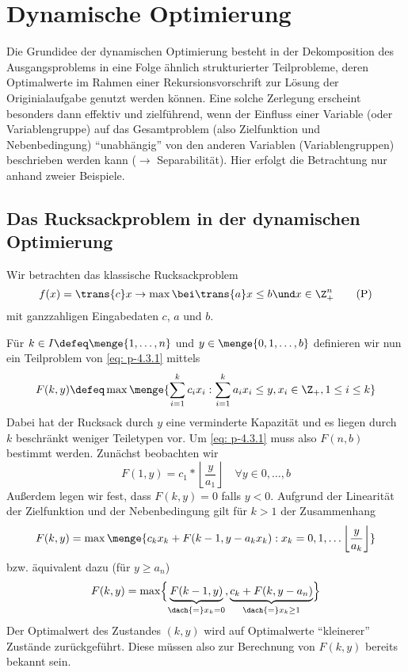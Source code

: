 \section{Dynamische Optimierung}

Die Grundidee der dynamischen Optimierung  besteht in der Dekomposition des Ausgangsproblems in eine Folge ähnlich strukturierter Teilprobleme, deren Optimalwerte im Rahmen einer Rekursionsvorschrift zur Lösung der Originialaufgabe genutzt werden können. Eine solche Zerlegung erscheint besonders dann effektiv und zielführend, wenn der Einfluss einer Variable (oder Variablengruppe) auf das Gesamtproblem (also Zielfunktion und Nebenbedingung) \enquote{unabhängig} von den anderen Variablen (Variablengruppen) beschrieben werden kann ($\to$ Separabilität). Hier erfolgt die Betrachtung nur anhand zweier Beispiele.

\subsection{Das Rucksackproblem in der dynamischen Optimierung}
Wir betrachten das klassische Rucksackproblem 
\begin{equation*}
	f(x) = \trans{c} x \to \max \bei \trans{a}x \le b \und x \in \Z_+^n \tag{P} \label{eq: p-4.3.1}
\end{equation*}
mit ganzzahligen Eingabedaten $c$, $a$ und $b$.

Für $k \in I \defeq \menge{1, \dots, n}$ und $y \in \menge{0,1,\dots, b}$ definieren wir nun ein Teilproblem von \eqref{eq: p-4.3.1} mittels
\begin{equation*}
	F(k,y) \defeq \max\menge{\sum_{i=1}^k c_i x_i : \sum_{i=1}^k a_i x_i \le y, x_i \in \Z_+, 1 \le i \le k}
\end{equation*}
Dabei hat der Rucksack durch $y$ eine verminderte Kapazität und es liegen durch $k$ beschränkt weniger Teiletypen vor.
Um \eqref{eq: p-4.3.1} muss also $F(n,b)$ bestimmt werden.
Zunächst beobachten wir
\begin{equation*}
	F(1,y) = c_1 * \left\lfloor \frac{y}{a_1} \right\rfloor \quad \forall y \in {0, \dots, b}
\end{equation*}
Außerdem legen wir fest, dass $F(k,y) = 0$ falls $y < 0$.
Aufgrund der Linearität der Zielfunktion und der Nebenbedingung gilt für $k > 1$ der Zusammenhang
\begin{equation*}
	F(k,y) = \max\menge{c_k x_k + F(k-1, y-a_k x_k): x_k = 0,1,\dots \left\lfloor \frac{y}{a_k} \right\rfloor}
\end{equation*}
bzw. äquivalent dazu (für $y \ge a_n$)
\begin{equation}
	F(k,y) = \max \Bigl\{  \underbrace{F(k-1,y)}_{\dach{=} x_k = 0}, \underbrace{c_k + F(k,y-a_n)}_{\dach{=} x_k \ge 1} \Bigr\}
	\label{eq: 4.6}
\end{equation}
Der Optimalwert des Zustandes $(k,y)$ wird auf Optimalwerte \enquote{kleinerer} Zustände zurückgeführt. Diese müssen also zur Berechnung von $F(k,y)$ bereits bekannt sein.

